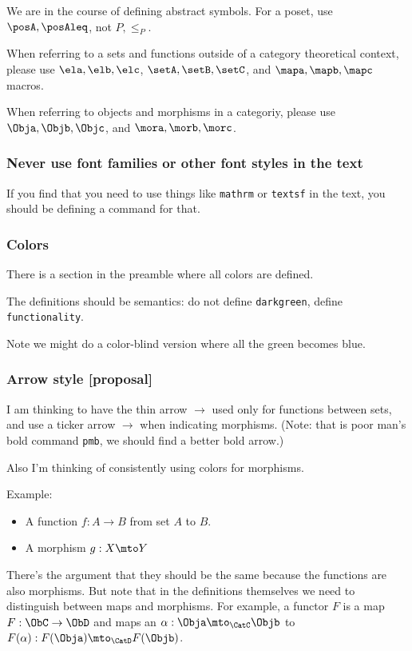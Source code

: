 We are in the course of defining abstract symbols.
For a poset, use $\posA,\posAleq$, not $P,\leq_P$.

When referring to a sets and functions outside of a category theoretical context, please use $\ela,\elb,\elc$, $\setA,\setB,\setC$, and $\mapa,\mapb,\mapc$ macros.

When referring to objects and morphisms in a categoriy, please use $\Obja,\Objb,\Objc$, and $\mora,\morb,\morc$.

\subsubsection*{Never use font families or other font styles in the text}

If you find that you need to use things like \texttt{mathrm} or \texttt{textsf} in the text, you should be defining a command for that.

\subsubsection*{Colors}

There is a section in the preamble where all colors are defined.

The definitions should be semantics: do not define \texttt{darkgreen}, define \texttt{functionality}.

Note we might do a color-blind version where all the green becomes blue.


\subsubsection*{Arrow style [proposal]}

I am thinking to have the thin arrow $\to$ used only for functions between sets, and use a ticker arrow $\pmb{\to}$ when indicating morphisms.
(Note: that is poor man's bold command \texttt{pmb}, we should find a better bold arrow.)


Also I'm thinking of consistently using colors for morphisms.

Example:
\begin{itemize}
  \item A function $f: A \to B$ from set $A$ to $B$.
  \item A morphism $g: X \mto  Y$
\end{itemize}

There's the argument that they should be the same because the functions are also morphisms. But note that in the definitions themselves we need to distinguish between maps and morphisms. For example, a functor $F$ is a map $F: \ObC \to \ObD$ and maps an $\alpha: \Obja \mto_{\CatC} \Objb $ to $F(\alpha): F(\Obja) \mto_{\CatD} F(\Objb) $.


